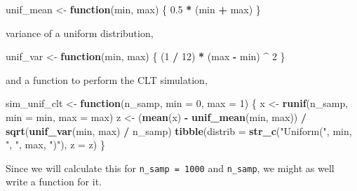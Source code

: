 \documentclass[]{book}
\newenvironment{Shaded}{\begin{snugshade}}{\end{snugshade}}
\newcommand{\KeywordTok}[1]{\textcolor[rgb]{0.13,0.29,0.53}{\textbf{#1}}}
\newcommand{\DataTypeTok}[1]{\textcolor[rgb]{0.13,0.29,0.53}{#1}}
\newcommand{\DecValTok}[1]{\textcolor[rgb]{0.00,0.00,0.81}{#1}}
\newcommand{\FloatTok}[1]{\textcolor[rgb]{0.00,0.00,0.81}{#1}}
\newcommand{\StringTok}[1]{\textcolor[rgb]{0.31,0.60,0.02}{#1}}
\newcommand{\ControlFlowTok}[1]{\textcolor[rgb]{0.13,0.29,0.53}{\textbf{#1}}}
\newcommand{\OperatorTok}[1]{\textcolor[rgb]{0.81,0.36,0.00}{\textbf{#1}}}
\newcommand{\NormalTok}[1]{#1}
\theoremstyle{definition}
\theoremstyle{definition}
\theoremstyle{definition}
\theoremstyle{remark}
\begin{document}
\begin{Shaded}
\begin{Highlighting}[]
\NormalTok{unif_mean <-}\StringTok{ }\ControlFlowTok{function}\NormalTok{(min, max) \{}
  \FloatTok{0.5} \OperatorTok{*}\StringTok{ }\NormalTok{(min }\OperatorTok{+}\StringTok{ }\NormalTok{max)}
\NormalTok{\}}
\end{Highlighting}
\end{Shaded}

variance of a uniform distribution,

\begin{Shaded}
\begin{Highlighting}[]
\NormalTok{unif_var <-}\StringTok{ }\ControlFlowTok{function}\NormalTok{(min, max) \{}
\NormalTok{  (}\DecValTok{1} \OperatorTok{/}\StringTok{ }\DecValTok{12}\NormalTok{) }\OperatorTok{*}\StringTok{ }\NormalTok{(max }\OperatorTok{-}\StringTok{ }\NormalTok{min) }\OperatorTok{^}\StringTok{ }\DecValTok{2}
\NormalTok{\}}
\end{Highlighting}
\end{Shaded}

and a function to perform the CLT simulation,

\begin{Shaded}
\begin{Highlighting}[]
\NormalTok{sim_unif_clt <-}\StringTok{ }\ControlFlowTok{function}\NormalTok{(n_samp, }\DataTypeTok{min =} \DecValTok{0}\NormalTok{, }\DataTypeTok{max =} \DecValTok{1}\NormalTok{) \{}
\NormalTok{  x <-}\StringTok{ }\KeywordTok{runif}\NormalTok{(n_samp, }\DataTypeTok{min =}\NormalTok{ min, }\DataTypeTok{max =}\NormalTok{ max)}
\NormalTok{  z <-}\StringTok{ }\NormalTok{(}\KeywordTok{mean}\NormalTok{(x) }\OperatorTok{-}\StringTok{ }\KeywordTok{unif_mean}\NormalTok{(min, max)) }\OperatorTok{/}
\StringTok{    }\KeywordTok{sqrt}\NormalTok{(}\KeywordTok{unif_var}\NormalTok{(min, max) }\OperatorTok{/}\StringTok{ }\NormalTok{n_samp)}
  \KeywordTok{tibble}\NormalTok{(}\DataTypeTok{distrib =} \KeywordTok{str_c}\NormalTok{(}\StringTok{"Uniform("}\NormalTok{, min, }\StringTok{", "}\NormalTok{, max, }\StringTok{")"}\NormalTok{),}
         \DataTypeTok{z =}\NormalTok{ z)}
\NormalTok{\}}
\end{Highlighting}
\end{Shaded}

Since we will calculate this for \texttt{n\_samp\ =\ 1000} and
\texttt{n\_samp}, we might as well write a function for it.
\end{document}
